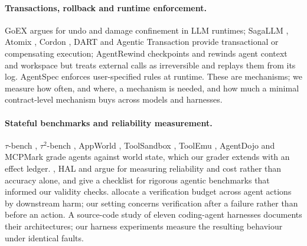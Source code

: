 \paragraph{Transactions, rollback and runtime enforcement.} GoEX \citep{patil2024goex} argues for undo and
damage confinement in LLM runtimes; SagaLLM \citep{chang2025sagallm}, Atomix \citep{mohammadi2026atomix},
Cordon \citep{chen2026cordon}, DART \citep{yang2026dart} and Agentic Transaction \citep{sun2026agentictx}
provide transactional or compensating execution; AgentRewind \citep{zhuang2026agentrewind} checkpoints and
rewinds agent context and workspace but treats external calls as irreversible and replays them from its log.
AgentSpec \citep{wang2026agentspec} enforces user-specified rules at runtime. These are mechanisms; we
measure how often, and where, a mechanism is needed, and how much a minimal contract-level mechanism buys
across models and harnesses.

\paragraph{Stateful benchmarks and reliability measurement.} $\tau$-bench \citep{yao2025taubench},
$\tau^2$-bench \citep{barres2025tau2}, AppWorld \citep{trivedi2024appworld}, ToolSandbox \citep{lu2024toolsandbox},
ToolEmu \citep{ruan2023toolemu}, AgentDojo \citep{debenedetti2024agentdojo} and MCPMark \citep{wu2025mcpmark}
grade agents against world state, which our grader extends with an effect ledger. \citet{rabanser2026science},
HAL \citep{kapoor2025hal} and \citet{kapoor2025agents} argue for measuring reliability and cost rather than
accuracy alone, and \citet{zhu2025abc} give a checklist for rigorous agentic benchmarks that informed our
validity checks. \citet{tang2026verify} allocate a verification budget across agent actions by downstream harm;
our setting concerns verification after a failure rather than before an action. A source-code study of eleven
coding-agent harnesses \citep{barbaste2026harness} documents their architectures; our harness experiments
measure the resulting behaviour under identical faults.
